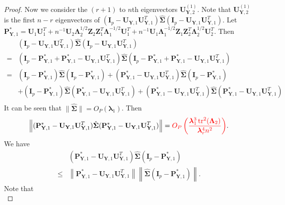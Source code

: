 \documentclass[12pt]{article} %
\DeclareMathOperator{\mytr}{tr}
\newcommand{\bZ}{\mathbf{Z}}
\newcommand{\bP}{\mathbf{P}}
\newcommand{\bY}{\mathbf{Y}}
\newcommand{\bI}{\mathbf{I}}
\newcommand{\bU}{\mathbf{U}}
\newcommand{\bfsym}[1]{\ensuremath{\boldsymbol{#1}}}
\def\blambda {\bfsym {\lambda}}
\def\bLambda {\bfsym {\Lambda}}
\def\bSigma {\bfsym {\Sigma}}
\theoremstyle{definition}
\begin{document}
\begin{appendices}
\begin{proof}
    Now we consider the $(r+1)$ to $n$th eigenvectors $\bU_{\bY,2}^{(1)}$.
    Note that $\bU_{\bY,2}^{(1)}$ is the first $n-r$ eigenvectors of $(\bI_p -\bU_{\bY,1}\bU_{\bY,1}^T)\hat{\bSigma}(\bI_p -\bU_{\bY,1}\bU_{\bY,1}^T)$.
    Let $\bP^*_{\bY,1}=
         \bU_1\bU_1^T
+
n^{-1}\bU_2 \bLambda_2^{1/2} \bZ_2 \bZ_1^T \bLambda_1^{-1/2} \bU_1^T
+
    n^{-1}\bU_1  \bLambda_1^{-1/2} \bZ_1 \bZ_2^T \bLambda_2^{1/2} \bU_2^T
    $.
    Then
    \begin{equation*}
        \begin{split}
             &(\bI_p -\bU_{\bY,1}\bU_{\bY,1}^T)\hat{\bSigma}(\bI_p -\bU_{\bY,1}\bU_{\bY,1}^T)
             \\
             =&
             (\bI_p -\bP^*_{\bY,1}+\bP^*_{\bY,1}-\bU_{\bY,1}\bU_{\bY,1}^T)\hat{\bSigma}(\bI_p-\bP^*_{\bY,1}+\bP^*_{\bY,1} -\bU_{\bY,1}\bU_{\bY,1}^T)
             \\
             =&
             (\bI_p -\bP^*_{\bY,1})\hat{\bSigma}(\bI_p-\bP^*_{\bY,1})
             +(\bP^*_{\bY,1}-\bU_{\bY,1}\bU_{\bY,1}^T)\hat{\bSigma}(\bI_p-\bP^*_{\bY,1})
             \\
             &+(\bI_p-\bP^*_{\bY,1})\hat{\bSigma}(\bP^*_{\bY,1}-\bU_{\bY,1}\bU_{\bY,1}^T)
             +
             (\bP^*_{\bY,1}-\bU_{\bY,1}\bU_{\bY,1}^T)\hat{\bSigma}(\bP^*_{\bY,1}-\bU_{\bY,1}\bU_{\bY,1}^T)
             \\
        \end{split}
    \end{equation*}
    It can be seen that $\|\hat{\bSigma}\|=O_P(\blambda_1)$. Then
    \begin{equation*}
             \left\|
             (\bP^*_{\bY,1}-\bU_{\bY,1}\bU_{\bY,1}^T)\hat{\bSigma}(\bP^*_{\bY,1}-\bU_{\bY,1}\bU_{\bY,1}^T)
             \right\|
             ={\color{red}
                 O_P\left(\frac{\blambda_1^3 \mytr^2 (\bLambda_2)}{\blambda_r^4 n^2}\right)
             }.
    \end{equation*}
    We have
    \begin{equation*}
        \begin{split}
             &(\bP^*_{\bY,1}-\bU_{\bY,1}\bU_{\bY,1}^T)\hat{\bSigma}(\bI_p-\bP^*_{\bY,1})
             \\
             \leq &
             \left\|\bP^*_{\bY,1}-\bU_{\bY,1}\bU_{\bY,1}^T\right\|
             \left\|\hat{\bSigma}(\bI_p-\bP^*_{\bY,1})\right\|.
        \end{split}
    \end{equation*}
    Note that
    \begin{equation*}

\end{equation*}
\end{proof}
\end{appendices}
\end{document}
